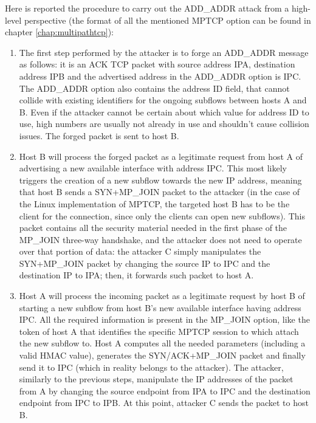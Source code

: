 Here is reported the procedure to carry out the ADD\_ADDR attack from a high-level perspective (the format of all the mentioned MPTCP option can be found in chapter \ref{chap:multipathtcp}):


\begin{enumerate}  
\item  The first step performed by the attacker is to forge an ADD\_ADDR message as follows: it is an ACK TCP packet with source address IPA, destination address IPB and the advertised address in the ADD\_ADDR option is IPC. The ADD\_ADDR option also contains the address ID field, that cannot collide with existing identifiers for the ongoing subflows between hosts A and B. Even if the attacker cannot be certain about which value for address ID to use, high numbers are usually not already in use and shouldn't cause collision issues.
The forged packet is sent to host B.

\item Host B will process the forged packet as a legitimate request from host A of advertising a new available interface with address IPC. This most likely triggers the creation of a new subflow towards the new IP address, meaning that host B sends a SYN+MP\_JOIN packet to the attacker (in the case of the Linux implementation of MPTCP, the targeted host B has to be the client for the connection, since only the clients can open new subflows). This packet contains all the security material needed in the first phase of the MP\_JOIN three-way handshake, and the attacker does not need to operate over that portion of data: the attacker C simply manipulates the SYN+MP\_JOIN packet by changing the source IP to IPC and the destination IP to IPA; then, it forwards such packet to host A.

\item Host A will process the incoming packet as a legitimate request by host B of starting a new subflow from host B's new available interface having address IPC. All the required information is present in the MP\_JOIN option, like the token of host A that identifies the specific MPTCP session to which attach the new subflow to. Host A computes all the needed parameters (including a valid HMAC value), generates the SYN/ACK+MP\_JOIN packet and finally send it to IPC (which in reality belongs to the attacker). The attacker, similarly to the previous steps, manipulate the IP addresses of the packet from A by changing the source endpoint from IPA to IPC and the destination endpoint from IPC to IPB. At this point, attacker C sends the packet to host B.


\end{enumerate}
